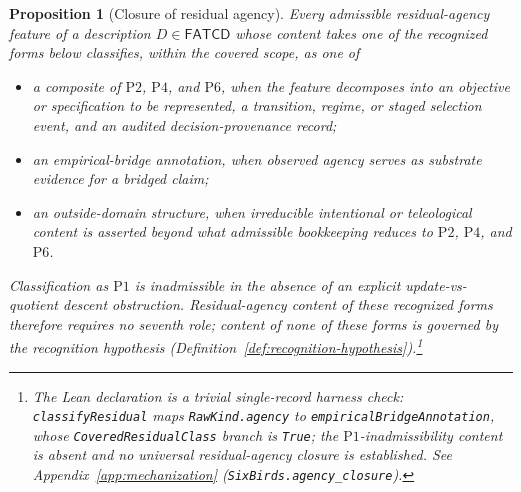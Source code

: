 \documentclass[11pt]{article}
\newtheorem{proposition}[theorem]{Proposition}
\theoremstyle{definition}
\newcommand{\FATCD}{\ensuremath{\mathsf{FATCD}}}
\newcommand{\Pone}{\ensuremath{\mathrm{P1}}}
\newcommand{\Ptwo}{\ensuremath{\mathrm{P2}}}
\newcommand{\Pfour}{\ensuremath{\mathrm{P4}}}
\newcommand{\Psix}{\ensuremath{\mathrm{P6}}}
\begin{document}
\begin{proposition}[Closure of residual agency]\label{prop:agency-closure}
Every admissible residual-agency feature of a description
\(D \in \FATCD{}\) whose content takes one of the recognized forms below
classifies, within the covered scope, as one of
\begin{itemize}[topsep=2pt,itemsep=1pt]
  \item a composite of \Ptwo{}, \Pfour{}, and \Psix{}, when the feature
    decomposes into an objective or specification to be represented, a
    transition, regime, or staged selection event, and an audited
    decision-provenance record;
  \item an empirical-bridge annotation, when observed agency serves as
    substrate evidence for a bridged claim;
  \item an outside-domain structure, when irreducible intentional or
    teleological content is asserted beyond what admissible
    bookkeeping reduces to \Ptwo{}, \Pfour{}, and \Psix{}.
\end{itemize}
Classification as \Pone{} is inadmissible in the absence of an explicit
update-vs-quotient descent obstruction. Residual-agency content of these recognized forms therefore requires no
seventh role; content of none of these forms is governed by the recognition
hypothesis (Definition~\ref{def:recognition-hypothesis}).\footnote{The Lean declaration is a trivial single-record harness check: \texttt{classifyResidual} maps \texttt{RawKind.agency} to \texttt{empiricalBridgeAnnotation}, whose \texttt{CoveredResidualClass} branch is \texttt{True}; the \Pone{}-inadmissibility content is absent and no universal residual-agency closure is established. See Appendix~\ref{app:mechanization} (\texttt{SixBirds.agency\_closure}).}
\end{proposition}
\end{document}
